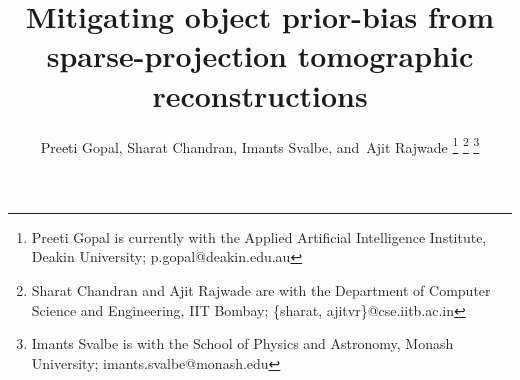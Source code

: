 \documentclass[journal]{IEEEtran}
\begin{document}
%
\title{Mitigating object prior-bias from sparse-projection tomographic reconstructions}
%
%
%

\author{Preeti Gopal,
  Sharat Chandran,
  Imants Svalbe,
        and~Ajit Rajwade
\thanks{Preeti Gopal is currently with the Applied Artificial Intelligence Institute, Deakin University; p.gopal@deakin.edu.au}
\thanks{Sharat Chandran and Ajit Rajwade are with the Department of Computer Science and Engineering, IIT Bombay; \{sharat, ajitvr\}@cse.iitb.ac.in}
\thanks{Imants Svalbe is with the School of Physics and Astronomy, Monash University; imants.svalbe@monash.edu}}



\maketitle
\end{document}
